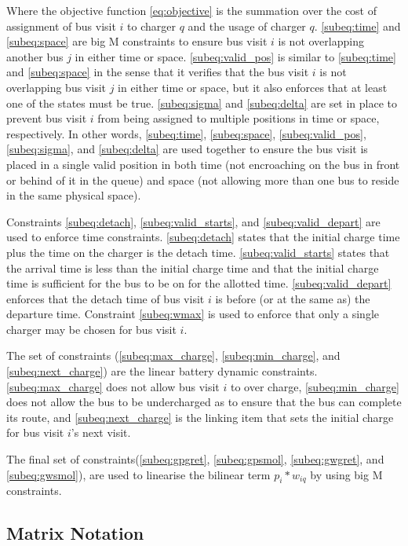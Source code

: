 \documentclass[conference]{IEEEtran}
\begin{document}
Where the objective function \eqref{eq:objective} is the summation over
the cost of assignment of bus visit \(i\) to charger \(q\) and the usage
of charger \(q\). \eqref{subeq:time} and \eqref{subeq:space} are big M
constraints to ensure bus visit \(i\) is not overlapping another bus
\(j\) in either time or space. \eqref{subeq:valid_pos} is similar to
\eqref{subeq:time} and \eqref{subeq:space} in the sense that it verifies
that the bus visit \(i\) is not overlapping bus visit \(j\) in either
time or space, but it also enforces that at least one of the states must
be true. \eqref{subeq:sigma} and \eqref{subeq:delta} are set in place to
prevent bus visit \(i\) from being assigned to multiple positions in
time or space, respectively. In other words, \eqref{subeq:time},
\eqref{subeq:space}, \eqref{subeq:valid_pos}, \eqref{subeq:sigma}, and
\eqref{subeq:delta} are used together to ensure the bus visit is placed
in a single valid position in both time (not encroaching on the bus in
front or behind of it in the queue) and space (not allowing more than
one bus to reside in the same physical space).

Constraints \eqref{subeq:detach}, \eqref{subeq:valid_starts}, and
\eqref{subeq:valid_depart} are used to enforce time constraints.
\eqref{subeq:detach} states that the initial charge time plus the time
on the charger is the detach time. \eqref{subeq:valid_starts} states
that the arrival time is less than the initial charge time and that the
initial charge time is sufficient for the bus to be on for the allotted
time. \eqref{subeq:valid_depart} enforces that the detach time of bus
visit \(i\) is before (or at the same as) the departure time. Constraint
\eqref{subeq:wmax} is used to enforce that only a single charger may be
chosen for bus visit \(i\).

The set of constraints (\eqref{subeq:max_charge},
\eqref{subeq:min_charge}, and \eqref{subeq:next_charge}) are the linear
battery dynamic constraints. \eqref{subeq:max_charge} does not allow bus
visit \(i\) to over charge, \eqref{subeq:min_charge} does not allow the
bus to be undercharged as to ensure that the bus can complete its route,
and \eqref{subeq:next_charge} is the linking item that sets the initial
charge for bus visit \(i\)'s next visit.

The final set of constraints(\eqref{subeq:gpgret}, \eqref{subeq:gpsmol},
\eqref{subeq:gwgret}, and \eqref{subeq:gwsmol}), are used to linearise
the bilinear term \(p_i*w_{iq}\) by using big M constraints.

\subsection{Matrix Notation}\label{matrix-notation}
\end{document}
